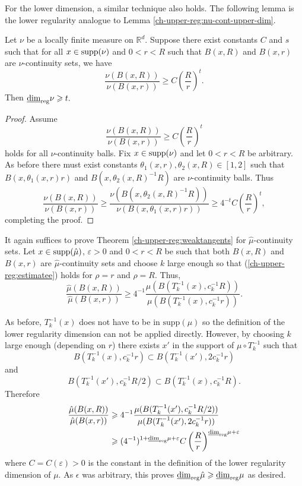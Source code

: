 For the lower dimension, a similar technique also holds. The following lemma is the lower regularity analogue to Lemma \ref{ch-upper-reg:nu-cont-upper-dim}.

\begin{lemma}\label{ch-upper-reg:nu-cont-lower-dim}
	Let $\nu$ be a locally finite measure  on $ \mathbb{R}^d$. Suppose there exist constants $C$ and $s$ such that for all $x\in \textup{supp}(\nu)$ and $0<r<R$ such that $B(x,R)$ and $B(x,r)$ are $\nu$-continuity sets, we have
	\[
	\frac{\nu(B(x,R))}{\nu(B(x,r))} \geq C\left(\frac{R}{r}\right)^{t}.
	\]
	Then $\underline{\dim}_{\textup{reg}}  \nu \ge t.$
\end{lemma}

\begin{proof}
	Assume 
	\[
	\frac{\nu(B(x,R))}{\nu(B(x,r))} \geq C\left(\frac{R}{r}\right)^{t}
	\]
	holds for all $\nu$-continuity balls. Fix $x  \in \textup{supp}(\nu)$ and let $0<r<R$ be arbitrary. As before there must exist constants $\theta_1(x,r),\theta_2(x,R)\in[1,2]$ such that $B(x,\theta_1(x,r)r)$ and $B(x,\theta_2(x,R)^{-1} R)$ are $\nu$-continuity balls. Thus
	\[
	\frac{\nu(B(x,R))}{\nu(B(x,r))} \geq \frac{\nu(B(x,\theta_2(x,R)^{-1}R))}{\nu(B(x,\theta_1(x,r)r))} \ge 4^{-t} C \left(\frac{R}{r}\right)^{t},
	\]
	completing the proof.
\end{proof}

It again suffices to prove Theorem \ref{ch-upper-reg:weaktangents} for $\hat{\mu}$-continuity sets. Let $x \in \textup{supp}( \hat \mu)$, $\varepsilon > 0 $ and  $0<r<R$ be such that both $B(x,R)$ and $B(x,r)$ are $\hat \mu$-continuity sets and choose $k$ large enough so that  (\ref{ch-upper-reg:estimatee}) holds for $\rho=r$ and $\rho=R$. Thus,  
\[
\frac{\hat{\mu}(B(x,R))}{\hat{\mu}(B(x,r))} \ge 4^{-1}\frac{\mu (B(T_k^{-1}(x),c_k^{-1}R))}{\mu (B(T_k^{-1}(x),c_k^{-1}r))}.
\]

As before, $T_k^{-1}(x)$ does not have to be in $\text{supp}(\mu)$ so the definition of the lower regularity dimension can not be applied directly. However, by choosing $k$ large enough (depending on $r$) there exists $x'$ in the support of $\mu \circ T_k^{-1}$ such that
\[
B(T_k^{-1}(x),c_k^{-1}r)\subset B(T_k^{-1}(x'),2c_k^{-1}r)
\]
and
\[
B(T_k^{-1}(x'),c_k^{-1}R/2) \subset B(T_k^{-1}(x), c_k^{-1}R).
\]
Therefore
\begin{align*}
\frac{\hat{\mu}(B(x,R))}{\hat{\mu}(B(x,r))} &\ge  4^{-1}\frac{\mu (B(T_k^{-1}(x'),c_k^{-1}R/2))}{\mu (B(T_k^{-1}(x'),2c_k^{-1}r))} \\
&\ge  (4^{-1})^{1+\lrdim \mu+ \varepsilon}C \left(\frac{R}{r}\right)^{\lrdim \mu + \varepsilon}
\end{align*}
where $C= C(\varepsilon)>0$ is the constant in the definition of the lower regularity dimension of $\mu$. As $\epsilon$ was arbitrary, this proves  $\underline{\dim}_{\textup{reg}} \hat{\mu} \ge \lrdim \mu$ as desired.










